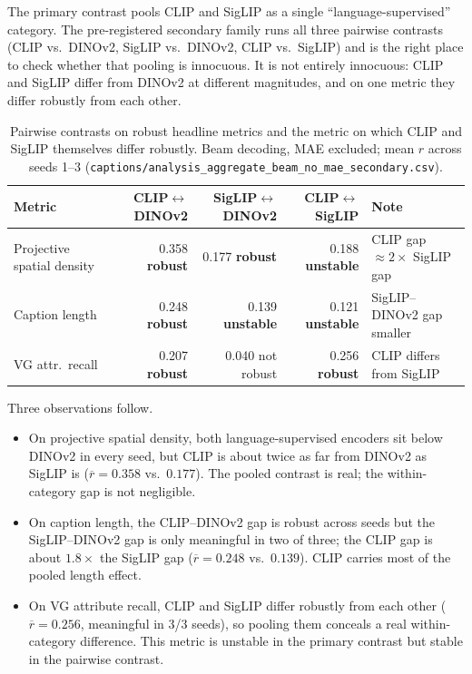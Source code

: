 \documentclass[11pt]{article}
\newcommand{\code}[1]{\texttt{#1}}
\newcommand{\robust}{\textcolor{green!45!black}{\textbf{robust}}}
\newcommand{\unstable}{\textcolor{orange!70!black}{\textbf{unstable}}}
\newcommand{\notrobust}{\textcolor{gray!70!black}{not robust}}
\begin{document}
The primary contrast pools CLIP and SigLIP as a single ``language-supervised''
category. The pre-registered secondary family runs all three pairwise contrasts
(CLIP vs.\ DINOv2, SigLIP vs.\ DINOv2, CLIP vs.\ SigLIP) and is the right place
to check whether that pooling is innocuous. It is not entirely innocuous: CLIP
and SigLIP differ from DINOv2 at different magnitudes, and on one metric they
differ robustly from each other.

\begin{table}[!htbp]
\centering
\caption{Pairwise contrasts on robust headline metrics and the metric on which
CLIP and SigLIP themselves differ robustly. Beam decoding, MAE excluded; mean
\(r\) across seeds 1--3 (\code{captions/analysis\_aggregate\_beam\_no\_mae\_secondary.csv}).}
\label{tab:within}
\footnotesize
\begin{tabular}{@{}l rrr l@{}}
\toprule
Metric & CLIP\(\leftrightarrow\)DINOv2 & SigLIP\(\leftrightarrow\)DINOv2 & CLIP\(\leftrightarrow\)SigLIP & Note \\
\midrule
Projective spatial density & 0.358 \robust & 0.177 \robust & 0.188 \unstable & CLIP gap \(\approx 2\times\) SigLIP gap \\
Caption length & 0.248 \robust & 0.139 \unstable & 0.121 \unstable & SigLIP--DINOv2 gap smaller \\
VG attr.\ recall & 0.207 \robust & 0.040 \notrobust & 0.256 \robust & CLIP differs from SigLIP \\
\bottomrule
\end{tabular}
\end{table}

Three observations follow.

\begin{itemize}
  \item On projective spatial density, both language-supervised encoders sit
  below DINOv2 in every seed, but CLIP is about twice as far from DINOv2 as
  SigLIP is (\(\overline{r}=0.358\) vs.\ \(0.177\)). The pooled contrast is real;
  the within-category gap is not negligible.
  \item On caption length, the CLIP--DINOv2 gap is robust across seeds but the
  SigLIP--DINOv2 gap is only meaningful in two of three; the CLIP gap is about
  \(1.8\times\) the SigLIP gap (\(\overline{r}=0.248\) vs.\ \(0.139\)). CLIP carries
  most of the pooled length effect.
  \item On VG attribute recall, CLIP and SigLIP differ robustly from each
  other (\(\overline{r}=0.256\), meaningful in 3/3 seeds), so pooling them
  conceals a real within-category difference. This metric is unstable in the
  primary contrast but stable in the pairwise contrast.
\end{itemize}
\end{document}
